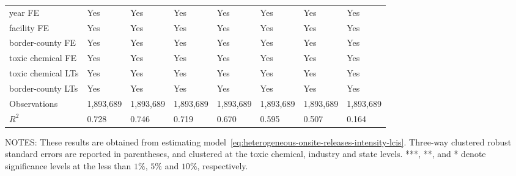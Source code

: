 \begin{table}[H]
{\begin{tabular}{@{}llllllll@{}}
            year FE                               & Yes       & Yes           & Yes       & Yes          & Yes             & Yes           & Yes                 \\
            facility FE                           & Yes       & Yes           & Yes       & Yes          & Yes             & Yes           & Yes                 \\
            border-county FE                      & Yes       & Yes           & Yes       & Yes          & Yes             & Yes           & Yes                 \\
            toxic chemical FE                     & Yes       & Yes           & Yes       & Yes          & Yes             & Yes           & Yes                 \\
            toxic chemical LTs                    & Yes       & Yes           & Yes       & Yes          & Yes             & Yes           & Yes                 \\
            border-county LTs                     & Yes       & Yes           & Yes       & Yes          & Yes             & Yes           & Yes                 \\\midrule
            Observations                          & 1,893,689 & 1,893,689     & 1,893,689 & 1,893,689    & 1,893,689       & 1,893,689     & 1,893,689           \\
            $R^2$                                 & 0.728     & 0.746         & 0.719     & 0.670        & 0.595           & 0.507         & 0.164               \\ \bottomrule\bottomrule
        \end{tabular}%
    }
    \begin{minipage}{\columnwidth}
        \vspace{0.05in}
        \tiny NOTES: These results are obtained from estimating model~\ref{eq:heterogeneous-onsite-releases-intensity-lcis}. Three-way clustered robust standard errors are reported in parentheses, and clustered at the toxic chemical, industry and state levels. ***, **, and * denote significance levels at the less than $1\%$, $5\%$ and $10\%$, respectively.
    \end{minipage}
\end{table}